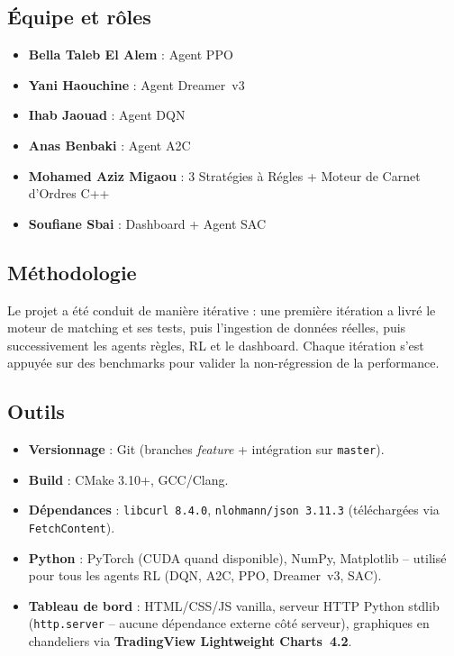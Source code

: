 \documentclass[11pt,a4paper]{article}
\begin{document}
\subsection{Équipe et rôles}

\begin{itemize}[leftmargin=1.2cm]
    \item \textbf{Bella Taleb El Alem} : Agent PPO
    \item \textbf{Yani Haouchine} : Agent Dreamer~v3
    \item \textbf{Ihab Jaouad} : Agent DQN
    \item \textbf{Anas Benbaki} : Agent A2C
    \item \textbf{Mohamed Aziz Migaou} :  3 Stratégies à Régles + Moteur de Carnet d'Ordres C++ 
    \item \textbf{Soufiane Sbai} : Dashboard + Agent SAC
\end{itemize}

\subsection{Méthodologie}

Le projet a été conduit de manière itérative : une première
itération a livré le moteur de matching et ses tests, puis
l'ingestion de données réelles, puis successivement les agents
règles, RL et le dashboard. Chaque itération s'est appuyée
sur des benchmarks pour valider la non-régression de la
performance.

\subsection{Outils}

\begin{itemize}[leftmargin=1.2cm]
    \item \textbf{Versionnage} : Git (branches \textit{feature}
          + intégration sur \texttt{master}).
    \item \textbf{Build} : CMake 3.10+, GCC/Clang.
    \item \textbf{Dépendances} : \texttt{libcurl 8.4.0},
          \texttt{nlohmann/json 3.11.3} (téléchargées via
          \texttt{FetchContent}).
    \item \textbf{Python} : PyTorch (CUDA quand disponible),
          NumPy, Matplotlib -- utilisé pour tous les agents RL
          (DQN, A2C, PPO, Dreamer~v3, SAC).
    \item \textbf{Tableau de bord} : HTML/CSS/JS vanilla,
          serveur HTTP Python stdlib (\texttt{http.server}
          -- aucune dépendance externe côté serveur),
          graphiques en chandeliers via
          \textbf{TradingView Lightweight Charts~4.2}.
\end{itemize}
\end{document}

